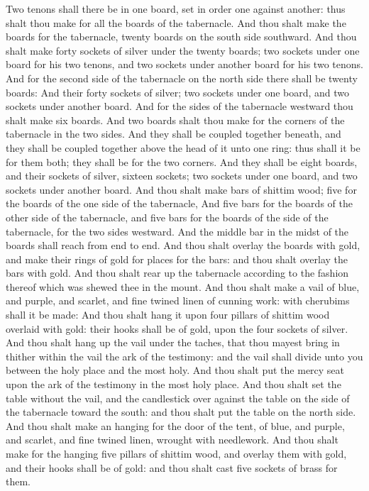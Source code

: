 \begin{biblechapter}
\verse Two tenons shall there be in one board, set in order one against another: thus shalt thou make for all the boards of the tabernacle.
\verse And thou shalt make the boards for the tabernacle, twenty boards on the south side southward.
\verse And thou shalt make forty sockets of silver under the twenty boards; two sockets under one board for his two tenons, and two sockets under another board for his two tenons.
\verse And for the second side of the tabernacle on the north side there shall be twenty boards:
\verse And their forty sockets of silver; two sockets under one board, and two sockets under another board.
\verse And for the sides of the tabernacle westward thou shalt make six boards.
\verse And two boards shalt thou make for the corners of the tabernacle in the two sides.
\verse And they shall be coupled together beneath, and they shall be coupled together above the head of it unto one ring: thus shall it be for them both; they shall be for the two corners.
\verse And they shall be eight boards, and their sockets of silver, sixteen sockets; two sockets under one board, and two sockets under another board.
\verse And thou shalt make bars of shittim wood; five for the boards of the one side of the tabernacle,
\verse And five bars for the boards of the other side of the tabernacle, and five bars for the boards of the side of the tabernacle, for the two sides westward.
\verse And the middle bar in the midst of the boards shall reach from end to end.
\verse And thou shalt overlay the boards with gold, and make their rings of gold for places for the bars: and thou shalt overlay the bars with gold.
\verse And thou shalt rear up the tabernacle according to the fashion thereof which was shewed thee in the mount.
\verse And thou shalt make a vail of blue, and purple, and scarlet, and fine twined linen of cunning work: with cherubims shall it be made:
\verse And thou shalt hang it upon four pillars of shittim wood overlaid with gold: their hooks shall be of gold, upon the four sockets of silver.
\verse And thou shalt hang up the vail under the taches, that thou mayest bring in thither within the vail the ark of the testimony: and the vail shall divide unto you between the holy place and the most holy.
\verse And thou shalt put the mercy seat upon the ark of the testimony in the most holy place.
\verse And thou shalt set the table without the vail, and the candlestick over against the table on the side of the tabernacle toward the south: and thou shalt put the table on the north side.
\verse And thou shalt make an hanging for the door of the tent, of blue, and purple, and scarlet, and fine twined linen, wrought with needlework.
\verse And thou shalt make for the hanging five pillars of shittim wood, and overlay them with gold, and their hooks shall be of gold: and thou shalt cast five sockets of brass for them.
\end{biblechapter}


